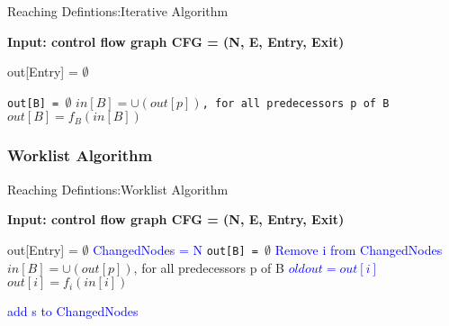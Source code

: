 \begin{algorithm}
    \caption{Reaching Defintions:Iterative Algorithm}\label{alg:reachingdefiterative}
    \hspace*{\algorithmicindent} \textbf{Input: control flow graph CFG = (N, E, Entry, Exit) } \\
   
    
    \begin{algorithmic}
   
    \State out[Entry] = $\emptyset$ 

        \State \texttt{out[B] = $\emptyset$} 
    \EndFor
        \State \texttt{$in[B] =  \cup (out[p])$, for all predecessors p of B}
        \State \texttt{$out[B] = f_B(in[B])$} 
        \EndFor

    \EndWhile
    \end{algorithmic}
\end{algorithm}




\subsubsection{ Worklist   Algorithm}

\begin{algorithm}
    \caption{Reaching Defintions:Worklist Algorithm}\label{alg:reachingdefiterative}
    \hspace*{\algorithmicindent} \textbf{Input: control flow graph CFG = (N, E, Entry, Exit) } \\
   
    
    \begin{algorithmic}
   
    \State out[Entry] = $\emptyset$ 
    \State \textcolor{blue}{ChangedNodes = N}   
        \State \texttt{out[B] = $\emptyset$} 
    \EndFor
        \State \textcolor{blue}{Remove i from ChangedNodes}
        \State $in[B] =  \cup (out[p])$, for all predecessors p of B
        \State \textcolor{blue}{$oldout = out[i]$}
        \State $out[i] = f_i(in[i])$ 

                \State \textcolor{blue}{add s to ChangedNodes}
            \EndFor
        \EndIf

    \EndWhile
    \end{algorithmic}
\end{algorithm}



